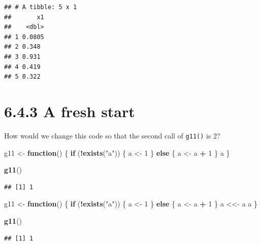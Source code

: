 \documentclass[]{book}
\newenvironment{Shaded}{\begin{snugshade}}{\end{snugshade}}
\newcommand{\ControlFlowTok}[1]{\textcolor[rgb]{0.13,0.29,0.53}{\textbf{#1}}}
\newcommand{\DecValTok}[1]{\textcolor[rgb]{0.00,0.00,0.81}{#1}}
\newcommand{\KeywordTok}[1]{\textcolor[rgb]{0.13,0.29,0.53}{\textbf{#1}}}
\newcommand{\NormalTok}[1]{#1}
\newcommand{\OperatorTok}[1]{\textcolor[rgb]{0.81,0.36,0.00}{\textbf{#1}}}
\newcommand{\StringTok}[1]{\textcolor[rgb]{0.31,0.60,0.02}{#1}}
\begin{document}
\begin{verbatim}
## # A tibble: 5 x 1
##       x1
##    <dbl>
## 1 0.0805
## 2 0.348 
## 3 0.931 
## 4 0.419 
## 5 0.322
\end{verbatim}

\hypertarget{a-fresh-start}{%
\section*{6.4.3 A fresh start}\label{a-fresh-start}}

How would we change this code so that the second call of \texttt{g11()} is 2?

\begin{Shaded}
\begin{Highlighting}[]
\NormalTok{g11 <-}\StringTok{ }\ControlFlowTok{function}\NormalTok{() \{}
  \ControlFlowTok{if}\NormalTok{ (}\OperatorTok{!}\KeywordTok{exists}\NormalTok{(}\StringTok{"a"}\NormalTok{)) \{}
\NormalTok{    a <-}\StringTok{ }\DecValTok{1}
\NormalTok{  \} }\ControlFlowTok{else}\NormalTok{ \{}
\NormalTok{    a <-}\StringTok{ }\NormalTok{a }\OperatorTok{+}\StringTok{ }\DecValTok{1}
\NormalTok{  \}}
\NormalTok{  a}
\NormalTok{\}}

\KeywordTok{g11}\NormalTok{()}
\end{Highlighting}
\end{Shaded}

\begin{verbatim}
## [1] 1
\end{verbatim}

\begin{Shaded}
\begin{Highlighting}[]
\NormalTok{g11 <-}\StringTok{ }\ControlFlowTok{function}\NormalTok{() \{}
  \ControlFlowTok{if}\NormalTok{ (}\OperatorTok{!}\KeywordTok{exists}\NormalTok{(}\StringTok{"a"}\NormalTok{)) \{}
\NormalTok{    a <-}\StringTok{ }\DecValTok{1}
\NormalTok{  \} }\ControlFlowTok{else}\NormalTok{ \{}
\NormalTok{    a <-}\StringTok{ }\NormalTok{a }\OperatorTok{+}\StringTok{ }\DecValTok{1}
\NormalTok{  \}}
\NormalTok{  a <<-}\StringTok{ }\NormalTok{a}
\NormalTok{  a}
\NormalTok{\}}

\KeywordTok{g11}\NormalTok{()}
\end{Highlighting}
\end{Shaded}

\begin{verbatim}
## [1] 1
\end{verbatim}
\end{document}
